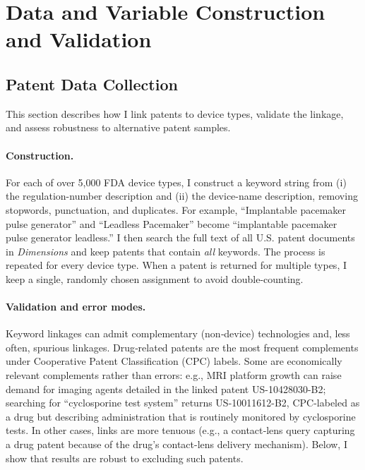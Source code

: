 \documentclass[letterpaper,12pt]{article}
\theoremstyle{definition}
\begin{document}
\section{Data and Variable Construction and Validation}\label{app:data}

\subsection{Patent Data Collection}\label{sec:appendixPatentCollection}


This section describes how I link patents to device types, validate the linkage, and assess robustness to alternative patent samples.


\paragraph{Construction.}


For each of over 5{,}000 FDA device types, I construct a keyword string from (i) the regulation-number description and (ii) the device-name description, removing stopwords, punctuation, and duplicates. For example, “Implantable pacemaker pulse generator” and “Leadless Pacemaker” become “implantable pacemaker pulse generator leadless.” I then search the full text of all U.S. patent documents in \emph{Dimensions} and keep patents that contain \emph{all} keywords. The process is repeated for every device type. When a patent is returned for multiple types, I keep a single, randomly chosen assignment to avoid double-counting.





\paragraph{Validation and error modes.}

Keyword linkages can admit complementary (non‐device) technologies and, less often, spurious linkages. Drug‐related patents are the most frequent complements under Cooperative Patent Classification (CPC) labels. Some are economically relevant complements rather than errors: e.g., MRI platform growth can raise demand for imaging agents detailed in the linked patent US-10428030-B2; searching for “cyclosporine test system” returns US-10011612-B2, CPC-labeled as a drug but describing administration that is routinely monitored by cyclosporine tests. In other cases, links are more tenuous (e.g., a contact‐lens query capturing a drug patent because of the drug's contact-lens delivery mechanism). Below, I show that results are robust to excluding such patents.
\end{document}
